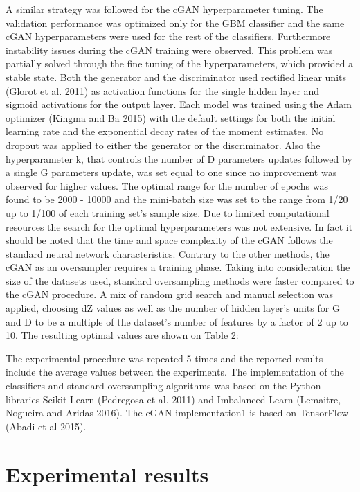 \documentclass[parskip=full]{scrartcl}
\begin{document}
A similar strategy was followed for the cGAN hyperparameter tuning. The
validation performance was optimized only for the GBM classifier and the same
cGAN hyperparameters were used for the rest of the classifiers. Furthermore
instability issues during the cGAN training were observed. This problem was
partially solved through the fine tuning of the hyperparameters, which provided
a stable state. Both the generator and the discriminator used rectified linear
units (Glorot et al. 2011) as activation functions for the single hidden layer
and sigmoid activations for the output layer. Each model was trained using the
Adam optimizer (Kingma and Ba 2015) with the default settings for both the
initial learning rate and the exponential decay rates of the moment estimates.
No dropout was applied to either the generator or the discriminator. Also the
hyperparameter k, that controls the number of D parameters updates followed by a
single G parameters update, was set equal to one since no improvement was
observed for higher values. The optimal range for the number of epochs was found
to be 2000 - 10000 and the mini-batch size was set to the range from 1/20 up to
1/100 of each training set’s sample size. Due to limited computational resources
the search for the optimal hyperparameters was not extensive. In fact it should
be noted that the time and space complexity of the cGAN follows the standard
neural network characteristics. Contrary to the other methods, the cGAN as an
oversampler requires a training phase. Taking into consideration the size of the
datasets used, standard oversampling methods were faster compared to the cGAN
procedure. A mix of random grid search and manual selection was applied,
choosing dZ values as well as the number of hidden layer’s units for G and D to
be a multiple of the dataset’s number of features by a factor of 2 up to 10. The
resulting optimal values are shown on Table 2:

The experimental procedure was repeated 5 times and the reported results include
the average values between the experiments. The implementation of the
classifiers and standard oversampling algorithms was based on the Python
libraries Scikit-Learn (Pedregosa et al. 2011) and Imbalanced-Learn (Lemaitre,
Nogueira and Aridas 2016). The cGAN implementation1 is based on TensorFlow
(Abadi et al 2015).

\section{Experimental results}
\end{document}
